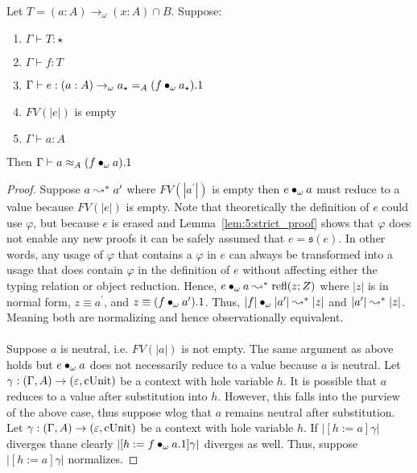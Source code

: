 \begin{lemma}
    \label{lem:5:phi_obs_id}
    Let $T = (a : A) \to_\omega (x : A) \cap B$.
    Suppose:
    \begin{enumerate}
        \item $\Gamma \vdash T : \star$
        \item $\Gamma \vdash f : T$
        \item $\Gamma \vdash e : (a : A) \to_\omega a_\star =_A (f \bullet_{\omega} a_\star).1$
        \item $FV(|e|)$ is empty
        \item $\Gamma \vdash a : A$
    \end{enumerate}
    Then $\Gamma \vdash a \approx_A (f \bullet_{\omega} a).1$
\end{lemma}
\begin{proof}
    Suppose $a \leadsto^* a^\prime$ where $FV(|a^\prime|)$ is empty then $e \bullet_{\omega} a$ must reduce to a value because $FV(|e|)$ is empty.
    Note that theoretically the definition of $e$ could use $\varphi$, but because $e$ is erased and Lemma~\ref{lem:5:strict_proof} shows that $\varphi$ does not enable any new proofs it can be safely assumed that $e = \mathfrak{s}(e)$.
    In other words, any usage of $\varphi$ that contains a $\varphi$ in $e$ can always be transformed into a usage that does contain $\varphi$ in the definition of $e$ without affecting either the typing relation or object reduction.
    Hence, $e \bullet_{\omega} a \leadsto^* \textnormal{refl}(z; Z)$ where $|z|$ is in normal form, $z \equiv a^\prime$, and $z \equiv (f \bullet_{\omega} a^\prime).1$.
    Thus, $|f| \bullet_{\omega} |a^\prime| \leadsto^* |z|$ and $|a^\prime| \leadsto^* |z|$.
    Meaning both are normalizing and hence observationally equivalent.
    \\ \\
    Suppose $a$ is neutral, i.e. $FV(|a|)$ is not empty.
    The same argument as above holds but $e \bullet_{\omega} a$ does not necessarily reduce to a value because $a$ is neutral.
    Let $\gamma : (\Gamma, A) \to (\varepsilon, \textnormal{cUnit})$ be a context with hole variable $h$.
    It is possible that $a$ reduces to a value after substitution into $h$.
    However, this falls into the purview of the above case, thus suppose wlog that $a$ remains neutral after substitution.
    Let $\gamma : (\Gamma, A) \to (\varepsilon, \textnormal{cUnit})$ be a context with hole variable $h$.
    If $|[h := a]\gamma|$ diverges thane clearly $|[h := f \bullet_{\omega} a.1]\gamma|$ diverges as well.
    Thus, suppose $|[h := a]\gamma|$ normalizes.

\end{proof}
